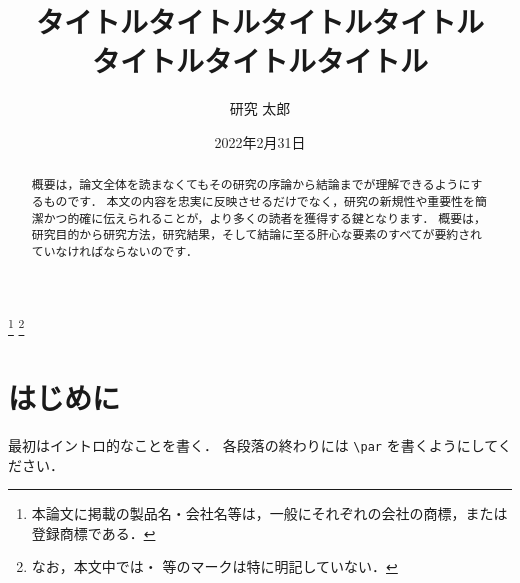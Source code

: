 \documentclass[a4paper,11pt]{jreport} %
\title{タイトルタイトルタイトルタイトル\\タイトルタイトルタイトル}  %
\author{研究 太郎}  %
\date{2022年2月31日}  %
\begin{document}
\maketitle
\clearpage

\begin{abstract}
  概要は，論文全体を読まなくてもその研究の序論から結論までが理解できるようにするものです．
  本文の内容を忠実に反映させるだけでなく，研究の新規性や重要性を簡潔かつ的確に伝えられることが，より多くの読者を獲得する鍵となります．
  概要は，研究目的から研究方法，研究結果，そして結論に至る肝心な要素のすべてが要約されていなければならないのです．
\end{abstract}


\footnote[0]{本論文に掲載の製品名・会社名等は，一般にそれぞれの会社の商標，または登録商標である．}
\footnote[0]{なお，本文中では\texttrademark ・ \textregistered 等のマークは特に明記していない．}


\setcounter{page}{0}

\tableofcontents

\clearpage


\chapter{はじめに}
\label{chap:Introduction}

最初はイントロ的なことを書く．
各段落の終わりには \verb|\par| を書くようにしてください．\par
\end{document}
